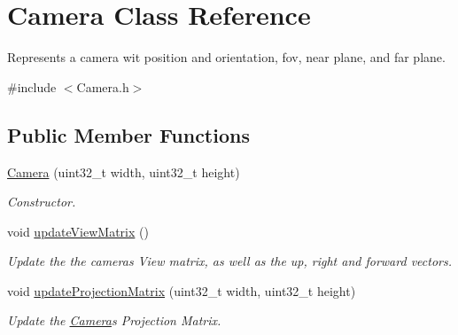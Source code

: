 \hypertarget{class_camera}{}\section{Camera Class Reference}
\label{class_camera}


Represents a camera wit position and orientation, fov, near plane, and far plane.  




{\ttfamily \#include $<$Camera.\+h$>$}

\subsection*{Public Member Functions}
\begin{DoxyCompactItemize}
\item 
\mbox{\hyperlink{class_camera_a4bb1853b56a6a3ca92432e5db0d7f375}{Camera}} (uint32\+\_\+t width, uint32\+\_\+t height)
\begin{DoxyCompactList}\small\item\em Constructor. \end{DoxyCompactList}\item 
\mbox{\label{class_camera_a8fe5c71a390571a861ad8afd99dfdea3}} 
void \mbox{\hyperlink{class_camera_a8fe5c71a390571a861ad8afd99dfdea3}{update\+View\+Matrix}} ()
\begin{DoxyCompactList}\small\item\em Update the the camera\textquotesingle{}s View matrix, as well as the up, right and forward vectors. \end{DoxyCompactList}\item 
void \mbox{\hyperlink{class_camera_a899a715cd940bf80eb157f0e63f4c06b}{update\+Projection\+Matrix}} (uint32\+\_\+t width, uint32\+\_\+t height)
\begin{DoxyCompactList}\small\item\em Update the \mbox{\hyperlink{class_camera}{Camera}}\textquotesingle{}s Projection Matrix. \end{DoxyCompactList}\end{DoxyCompactItemize}
